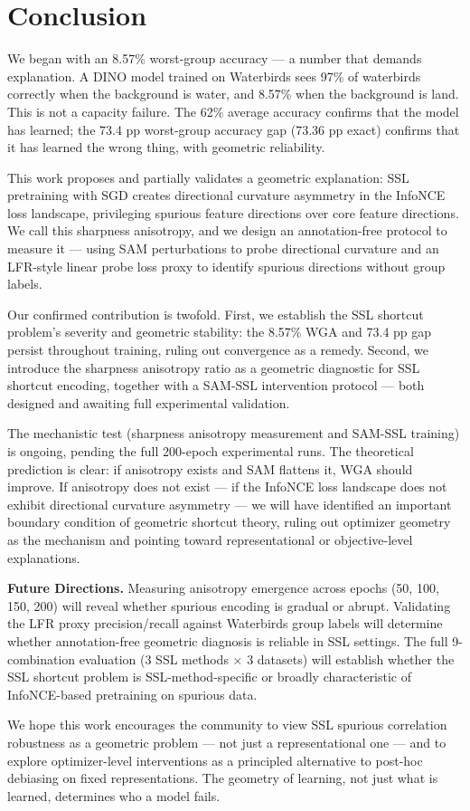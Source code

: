 \section{Conclusion}
\label{sec:conclusion}

We began with an 8.57\% worst-group accuracy --- a number that demands explanation. A DINO model trained on Waterbirds sees 97\% of waterbirds correctly when the background is water, and 8.57\% when the background is land. This is not a capacity failure. The 62\% average accuracy confirms that the model has learned; the 73.4 pp worst-group accuracy gap (73.36 pp exact) confirms that it has learned the wrong thing, with geometric reliability.

This work proposes and partially validates a geometric explanation: SSL pretraining with SGD creates directional curvature asymmetry in the InfoNCE loss landscape, privileging spurious feature directions over core feature directions. We call this sharpness anisotropy, and we design an annotation-free protocol to measure it --- using SAM perturbations to probe directional curvature and an LFR-style linear probe loss proxy to identify spurious directions without group labels.

Our confirmed contribution is twofold. First, we establish the SSL shortcut problem's severity and geometric stability: the 8.57\% WGA and 73.4 pp gap persist throughout training, ruling out convergence as a remedy. Second, we introduce the sharpness anisotropy ratio as a geometric diagnostic for SSL shortcut encoding, together with a SAM-SSL intervention protocol --- both designed and awaiting full experimental validation.

The mechanistic test (sharpness anisotropy measurement and SAM-SSL training) is ongoing, pending the full 200-epoch experimental runs. The theoretical prediction is clear: if anisotropy exists and SAM flattens it, WGA should improve. If anisotropy does not exist --- if the InfoNCE loss landscape does not exhibit directional curvature asymmetry --- we will have identified an important boundary condition of geometric shortcut theory, ruling out optimizer geometry as the mechanism and pointing toward representational or objective-level explanations.

\textbf{Future Directions.} Measuring anisotropy emergence across epochs (50, 100, 150, 200) will reveal whether spurious encoding is gradual or abrupt. Validating the LFR proxy precision/recall against Waterbirds group labels will determine whether annotation-free geometric diagnosis is reliable in SSL settings. The full 9-combination evaluation (3 SSL methods $\times$ 3 datasets) will establish whether the SSL shortcut problem is SSL-method-specific or broadly characteristic of InfoNCE-based pretraining on spurious data.

We hope this work encourages the community to view SSL spurious correlation robustness as a geometric problem --- not just a representational one --- and to explore optimizer-level interventions as a principled alternative to post-hoc debiasing on fixed representations. The geometry of learning, not just what is learned, determines who a model fails.
